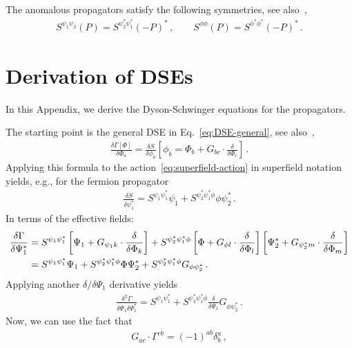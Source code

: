 The anomalous propagators satisfy the following symmetries, see also~\cite{Frank2018},
\begin{align}
	S^{\psi_1\psi_2}(P) = S^{\psi^*_2\psi^*_1}(-P)^* \,, \qquad 
	S^{\phi\phi}(P) = S^{\phi^*\phi^*}(-P)^* \,.
\end{align}

\clearpage

\section{Derivation of DSEs}
\label{app:derivation-dse}

In this Appendix, we derive the Dyson-Schwinger equations for the propagators.

The starting point is the general DSE in Eq.~\eqref{eq:DSE-general}, see also~\cite{Pawlowski2021},
\begin{align}
	\frac{\delta\Gamma\left[\Phi\right]}{\delta\Phi_a} =
	\frac{\delta S}{\delta\phi_a}\left[ \phi_b = \Phi_b
	+ G_{bc} \cdot \frac{\delta}{\delta \Phi_c} \right] \,.
\end{align}
Applying this formula to the action~\eqref{eq:superfield-action} in superfield notation yields, e.g., for the fermion propagator
\begin{align}
	\frac{\delta S}{\delta\psi^*_1} = S^{\psi_1\psi^*_1} \psi_1 +
	S^{\psi^*_2\psi^*_1\phi} \phi\psi^*_2 \,.
\end{align}
In terms of the effective fields:
\begin{align}
	\frac{\delta\Gamma}{\delta\Psi_1^*} &=
	S^{\psi_1\psi^*_1} \left[\Psi_1 + G_{\psi_1 k}
	\cdot \frac{\delta}{\delta \Phi_k} \right]
	+ S^{\psi^*_2\psi^*_1\phi} \left[\Phi + G_{\phi l}
	\cdot \frac{\delta}{\delta \Phi_l} \right]
	\left[\Psi^*_2 + G_{\psi^*_2 m}
	\cdot \frac{\delta}{\delta \Phi_m} \right] \notag \\
	&= S^{\psi_1\psi^*_1} \Psi_1 + S^{\psi^*_2\psi^*_1\phi} \Phi \Psi^*_2
	+ S^{\psi^*_2\psi^*_1\phi} G_{\phi \psi^*_2} \,.
\end{align}
Applying another $\delta/\delta\Psi_1$ derivative yields
\begin{align}
	\frac{\delta^2\Gamma}{\delta\Psi_1\delta\Psi_1^*} =
	S^{\psi_1\psi^*_1} + S^{\psi^*_2\psi^*_1\phi}
	\frac{\delta}{\delta\Psi_1} G_{\phi \psi^*_2} \,.
\end{align}
Now, we can use the fact that~\cite{Wink2020}
\begin{align}
	G_{ac} \cdot \Gamma^{cb}
	= (-1)^{ab} \delta^a_b \,,
\end{align}
